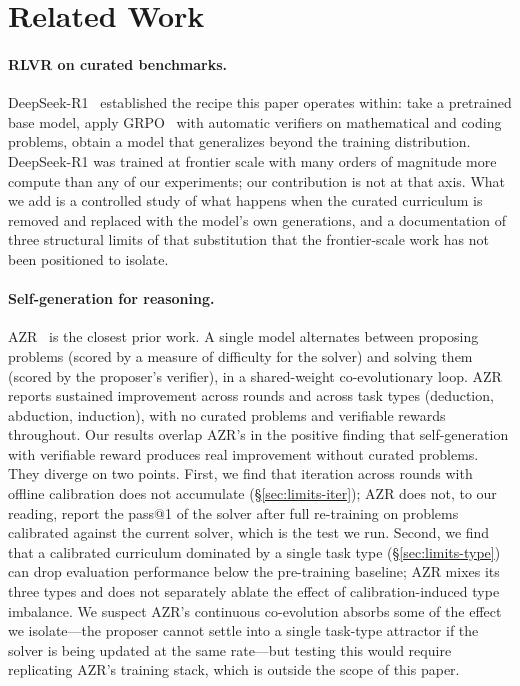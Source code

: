 \documentclass[11pt,a4paper]{article}
\begin{document}
\section{Related Work}
\label{sec:related}

\paragraph{RLVR on curated benchmarks.}
DeepSeek-R1~\citep{deepseek2025r1} established the recipe this paper operates within: take a pretrained base model, apply GRPO~\citep{shao2024grpo} with automatic verifiers on mathematical and coding problems, obtain a model that generalizes beyond the training distribution.
DeepSeek-R1 was trained at frontier scale with many orders of magnitude more compute than any of our experiments; our contribution is not at that axis.
What we add is a controlled study of what happens when the curated curriculum is removed and replaced with the model's own generations, and a documentation of three structural limits of that substitution that the frontier-scale work has not been positioned to isolate.

\paragraph{Self-generation for reasoning.}
AZR~\citep{zhao2025azr} is the closest prior work.
A single model alternates between proposing problems (scored by a measure of difficulty for the solver) and solving them (scored by the proposer's verifier), in a shared-weight co-evolutionary loop.
AZR reports sustained improvement across rounds and across task types (deduction, abduction, induction), with no curated problems and verifiable rewards throughout.
Our results overlap AZR's in the positive finding that self-generation with verifiable reward produces real improvement without curated problems.
They diverge on two points.
First, we find that iteration across rounds with offline calibration does not accumulate (\S\ref{sec:limits-iter}); AZR does not, to our reading, report the pass@1 of the solver after full re-training on problems calibrated against the current solver, which is the test we run.
Second, we find that a calibrated curriculum dominated by a single task type (\S\ref{sec:limits-type}) can drop evaluation performance below the pre-training baseline; AZR mixes its three types and does not separately ablate the effect of calibration-induced type imbalance.
We suspect AZR's continuous co-evolution absorbs some of the effect we isolate---the proposer cannot settle into a single task-type attractor if the solver is being updated at the same rate---but testing this would require replicating AZR's training stack, which is outside the scope of this paper.
\end{document}
